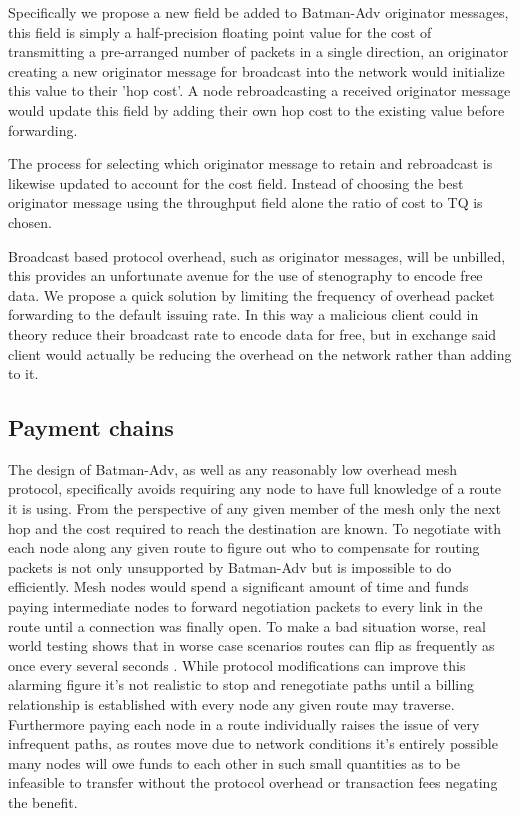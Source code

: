 \documentclass[11pt]{article}
\begin{document}
		Specifically we propose a new field be added to Batman-Adv originator messages, this field is simply a half-precision floating point value for the cost of transmitting a pre-arranged number of packets in a single direction, an originator creating a new originator message for broadcast into the network would initialize this value to their 'hop cost'. A node rebroadcasting a received originator message would update this field by adding their own hop cost to the existing value before forwarding.

	        The process for selecting which originator message to retain and rebroadcast is likewise updated to account for the cost field. Instead of choosing the best originator message using the throughput field alone the ratio of cost to TQ is chosen.

                Broadcast based protocol overhead, such as originator messages, will be unbilled, this provides an unfortunate avenue for the use of stenography to encode free data. We propose a quick solution by limiting the frequency of overhead packet forwarding to the default issuing rate. In this way a malicious client could in theory reduce their broadcast rate to encode data for free, but in exchange said client would actually be reducing the overhead on the network rather than adding to it.


	\subsection{Payment chains} \label{paychains}

               The design of Batman-Adv, as well as any reasonably low overhead mesh protocol, specifically avoids requiring any node to have full knowledge of a route it is using. From the perspective of any given member of the mesh only the next hop and the cost required to reach the destination are known. To negotiate with each node along any given route to figure out who to compensate for routing packets is not only unsupported by Batman-Adv but is impossible to do efficiently. Mesh nodes would spend a significant amount of time and funds paying intermediate nodes to forward negotiation packets to every link in the route until a connection was finally open. To make a bad situation worse, real world testing shows that in worse case scenarios routes can flip as frequently as once every several seconds \cite{meshflip}. While protocol modifications can improve this alarming figure it's not realistic to stop and renegotiate paths until a billing relationship is established with every node any given route may traverse. Furthermore paying each node in a route individually raises the issue of very infrequent paths, as routes move due to network conditions it's entirely possible many nodes will owe funds to each other in such small quantities as to be infeasible to transfer without the protocol overhead or transaction fees negating the benefit.
               
\end{document}
